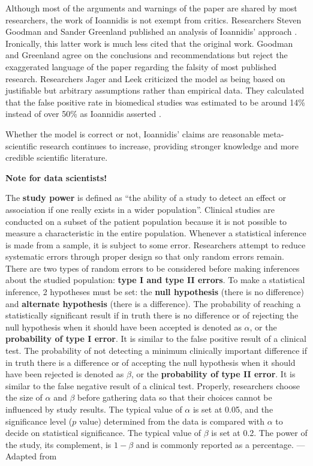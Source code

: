 \documentclass[
]{book}
\begin{document}
Although most of the arguments and warnings of the paper are shared by most researchers, the work of Ioannidis is not exempt from critics. Researchers Steven Goodman and Sander Greenland published an analysis of Ioannidis' approach \citep{goodman2007most}. Ironically, this latter work is much less cited that the original work. Goodman and Greenland agree on the conclusions and recommendations but reject the exaggerated language of the paper regarding the falsity of most published research. Researchers Jager and Leek criticized the model as being based on justifiable but arbitrary assumptions rather than empirical data. They calculated that the false positive rate in biomedical studies was estimated to be around 14\% instead of over 50\% as Ioannidis asserted \citep{jager2014estimate}.

Whether the model is correct or not, Ioannidis' claims are reasonable meta-scientific research continues to increase, providing stronger knowledge and more credible scientific literature.

\begin{tipbox}

\textbf{Note for data scientists!}

The \textbf{study power} is defined as ``the ability of a study to detect an effect or association if one really exists in a wider population''. Clinical studies are conducted on a subset of the patient population because it is not possible to measure a characteristic in the entire population. Whenever a statistical inference is made from a sample, it is subject to some error. Researchers attempt to reduce systematic errors through proper design so that only random errors remain. There are two types of random errors to be considered before making inferences about the studied population: \textbf{type I and type II errors}. To make a statistical inference, 2 hypotheses must be set: the \textbf{null hypothesis} (there is no difference) and \textbf{alternate hypothesis} (there is a difference). The probability of reaching a statistically significant result if in truth there is no difference or of rejecting the null hypothesis when it should have been accepted is denoted as \(\alpha\), or the \textbf{probability of type I error}. It is similar to the false positive result of a clinical test. The probability of not detecting a minimum clinically important difference if in truth there is a difference or of accepting the null hypothesis when it should have been rejected is denoted as \(\beta\), or the \textbf{probability of type II error}. It is similar to the false negative result of a clinical test. Properly, researchers choose the size of \(\alpha\) and \(\beta\) before gathering data so that their choices cannot be influenced by study results. The typical value of \(\alpha\) is set at 0.05, and the significance level (\(p\) value) determined from the data is compared with \(\alpha\) to decide on statistical significance. The typical value of \(\beta\) is set at 0.2. The power of the study, its complement, is \(1-\beta\) and is commonly reported as a percentage. --- Adapted from \citep{cadeddu2008users}

\end{tipbox}
\end{document}
